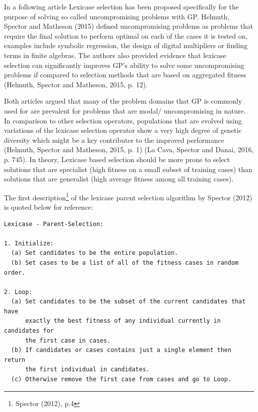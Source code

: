 \documentclass[
  12pt,
]{article}
\begin{document}
In a following article Lexicase selection has been proposed specifically
for the purpose of solving so called uncompromising problems with GP.
Helmuth, Spector and Matheson (2015) defined uncompromising problems as
problems that require the final solution to perform optimal on each of
the cases it is tested on, examples include symbolic regression, the
design of digital multipliers or finding terms in finite algebras. The
authors also provided evidence that lexicase selection can significantly
improves GP's ability to solve some uncompromising problems if compared
to selection methods that are based on aggregated fitness (Helmuth,
Spector and Matheson, 2015, p. 12).

Both articles argued that many of the problem domains that GP is
commonly used for are prevalent for problems that are modal/
uncompromising in nature. In comparison to other selection operators,
populations that are evolved using variations of the lexicase selection
operator show a very high degree of genetic diversity which might be a
key contributer to the improved performance (Helmuth, Spector and
Matheson, 2015, p. 1) (La Cava, Spector and Danai, 2016, p. 745). In
theory, Lexicase based selection should be more prone to select
solutions that are specialist (high fitness on a small subset of
training cases) than solutions that are generalist (high average fitness
among all training cases).

The first description\footnote{Spector (2012), p.4} of the lexicase
parent selection algorithm by Spector (2012) is quoted below for
reference:

\begin{verbatim}
Lexicase - Parent-Selection:

1. Initialize:
  (a) Set candidates to be the entire population.
  (b) Set cases to be a list of all of the fitness cases in random order.

2. Loop:
  (a) Set candidates to be the subset of the current candidates that have 
      exactly the best fitness of any individual currently in candidates for 
      the first case in cases.
  (b) If candidates or cases contains just a single element then return
      the first individual in candidates.
  (c) Otherwise remove the first case from cases and go to Loop.
\end{verbatim}
\end{document}
